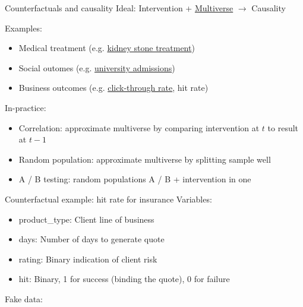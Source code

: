 \begin{frame}{Counterfactuals and causality}
    Ideal: Intervention + \href{https://en.wikipedia.org/wiki/Multiverse}{Multiverse} $\rightarrow$ Causality\newline

    Examples:
    \begin{itemize}
        \item Medical treatment (e.g. \href{https://en.wikipedia.org/wiki/Simpson\%27s_paradox\#Kidney_stone_treatment}{kidney stone treatment})
        \item Social outomes (e.g. \href{https://en.wikipedia.org/wiki/Simpson\%27s_paradox\#UC_Berkeley_gender_bias}{university admissions})
        \item Business outcomes (e.g. \href{https://en.wikipedia.org/wiki/Click-through\_rate}{click-through rate}, hit rate)\newline
    \end{itemize}

    In-practice:
    \begin{itemize}
        \item Correlation: approximate multiverse by comparing intervention at $t$ to result at $t-1$
        \item Random population: approximate multiverse by splitting sample well
        \item A / B testing: random populations A / B + intervention in one
    \end{itemize}
\end{frame}

\begin{frame}{Counterfactual example: hit rate for insurance}
    Variables:
    \begin{itemize}
        \item product\_type: Client line of business
        \item days: Number of days to generate quote
        \item rating: Binary indication of client risk
        \item hit: Binary, 1 for success (binding the quote), 0 for failure\newline
    \end{itemize}

    Fake data:\newline\newline
    \newline
\end{frame}


